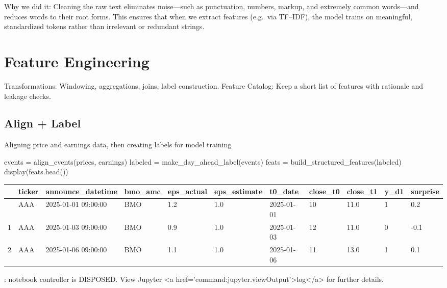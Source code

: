 \documentclass[
  letterpaper,
  DIV=11,
  numbers=noendperiod]{scrartcl}
\newenvironment{Shaded}{\begin{snugshade}}{\end{snugshade}}
\newcommand{\NormalTok}[1]{\textcolor[rgb]{0.00,0.23,0.31}{#1}}
\newcommand{\OperatorTok}[1]{\textcolor[rgb]{0.37,0.37,0.37}{#1}}
\renewenvironment{Shaded}{%
  \begin{tcolorbox}[%
    enhanced,%
    colback=codebg,%
    colframe=codebg,%
    borderline west={3pt}{0pt}{sectionblue},%
    boxrule=0pt,%
    arc=0pt,%
    boxsep=5pt,%
    left=2mm,%
    right=2mm,%
    top=2mm,%
    bottom=2mm%
  ]%
}{%
  \end{tcolorbox}%
}
\begin{document}
Why we did it: Cleaning the raw text eliminates noise---such as
punctuation, numbers, markup, and extremely common words---and reduces
words to their root forms. This ensures that when we extract features
(e.g.~via TF--IDF), the model trains on meaningful, standardized tokens
rather than irrelevant or redundant strings.

\section{Feature Engineering}\label{feature-engineering}

Transformations: Windowing, aggregations, joins, label construction.
Feature Catalog: Keep a short list of features with rationale and
leakage checks.

\subsection{Align + Label}\label{align-label}

Aligning price and earnings data, then creating labels for model
training

\begin{Shaded}
\begin{Highlighting}[]
\NormalTok{events }\OperatorTok{=}\NormalTok{ align\_events(prices, earnings)}
\NormalTok{labeled }\OperatorTok{=}\NormalTok{ make\_day\_ahead\_label(events)}
\NormalTok{feats }\OperatorTok{=}\NormalTok{ build\_structured\_features(labeled)}
\NormalTok{display(feats.head())}
\end{Highlighting}
\end{Shaded}

\begin{longtable}[]{@{}lllllllllll@{}}
\toprule\noalign{}
& ticker & announce\_datetime & bmo\_amc & eps\_actual & eps\_estimate &
t0\_date & close\_t0 & close\_t1 & y\_d1 & surprise \\
\midrule\noalign{}
\endhead
\bottomrule\noalign{}
\endlastfoot
0 & AAA & 2025-01-01 09:00:00 & BMO & 1.2 & 1.0 & 2025-01-01 & 10 & 11.0
& 1 & 0.2 \\
1 & AAA & 2025-01-03 09:00:00 & BMO & 0.9 & 1.0 & 2025-01-03 & 12 & 11.0
& 0 & -0.1 \\
2 & AAA & 2025-01-06 09:00:00 & BMO & 1.1 & 1.0 & 2025-01-06 & 11 & 13.0
& 1 & 0.1 \\
\end{longtable}

\begin{Highlighting}
\textcolor{black}{: }
\textcolor{black}{}\textcolor{QuartoInternalColor1}{notebook controller is DISPOSED. }
\textcolor{QuartoInternalColor1}{}\textcolor{QuartoInternalColor1}{View Jupyter <a href='command:jupyter.viewOutput'>log</a> for further details.}
\end{Highlighting}
\end{document}
